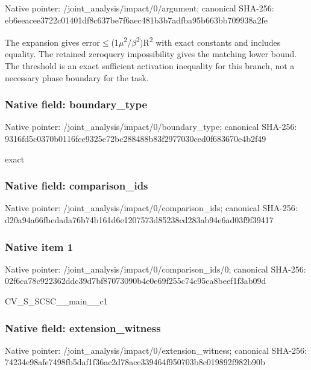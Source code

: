 \documentclass[10pt,a4paper]{article}
\begin{document}
Native pointer: /joint\_analysis/impact/0/argument; canonical SHA-256: eb6eeacee3722c01401df8c6\allowbreak{}37be7f6aec481b3b7adfba95\allowbreak{}b663bb709938a2fe


The expansion gives error\ensuremath{\le}(1\ensuremath{\mu}\textsuperscript{2}/\ensuremath{\beta}\textsuperscript{2})R\textsuperscript{2} with exact constants and includes equality. The retained zeroquery impossibility gives the matching lower bound. The threshold is an exact sufficient activation inequality for this branch, not a necessary phase boundary for the task.


\subsubsection{Native field: boundary\_type}


Native pointer: /joint\_analysis/impact/0/boundary\_type; canonical SHA-256: 9316fd5c0370b0116fce9325\allowbreak{}e72bc288488b83f2977030ce\allowbreak{}d0f683670e4b2f49


exact


\subsubsection{Native field: comparison\_ids}


Native pointer: /joint\_analysis/impact/0/comparison\_ids; canonical SHA-256: d20a94a66fbedada76b74b16\allowbreak{}1d6e1207573d85238cd283ab\allowbreak{}94e6ad03f9f39417



\subsubsection{Native item 1}


Native pointer: /joint\_analysis/impact/0\allowbreak{}/comparison\_ids/0; canonical SHA-256: 02f6ca78c922362ddc39d7bf\allowbreak{}87073090b4e0e69f255c74c9\allowbreak{}5ca8beef1f3ab09d


CV\_S\_SCSC\_\_main\_\_c1


\subsubsection{Native field: extension\_witness}


Native pointer: /joint\_analysis/impact/0\allowbreak{}/extension\_witness; canonical SHA-256: 74234e98afe7498fb5daf1f3\allowbreak{}6ac2d78acc339464f950703b\allowbreak{}8c019892f982b90b
\end{document}
